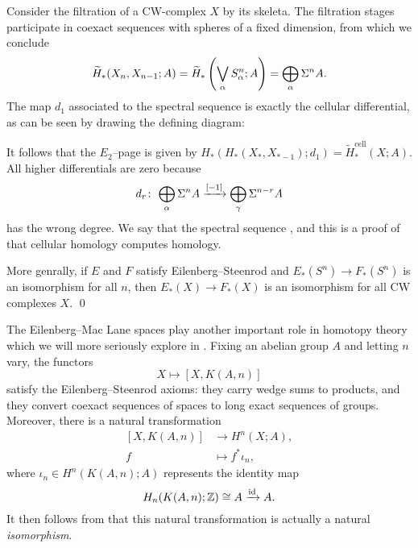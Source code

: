 \begin{example}\label{CellularHomologyWorks}
Consider the filtration of a CW-complex $X$ by its skeleta.
The filtration stages participate in coexact sequences with spheres of a fixed dimension, from which we conclude \[\widetilde H_*(X_n, X_{n-1}; A) = \widetilde H_*\left(\bigvee_\alpha S^n_\alpha ; A\right) = \bigoplus_\alpha \Sigma^n A.\]
The map $d_1$ associated to the spectral sequence is exactly the cellular differential, as can be seen by drawing the defining diagram:
\begin{center}
\end{center}
It follows that the $E_2$--page is given by $H_*(H_*(X_*, X_{*-1}); d_1) = \widetilde H_*^{\mathrm{cell}}(X; A)$.
All higher differentials are zero because \[d_r\colon\thinspace \bigoplus_\alpha \Sigma^n A \xrightarrow{[-1]} \bigoplus_\gamma \Sigma^{n-r} A\] has the wrong degree.
We say that the spectral sequence , and this is a proof of that cellular homology computes homology.
\end{example}

\begin{corollary}\label{SpheresDetectEquivalenceOfCohomologyTheories}
More genrally, if $E$ and $F$ satisfy Eilenberg--Steenrod and $E_*(S^n) \to F_*(S^n)$ is an isomorphism for all $n$, then $E_*(X) \to F_*(X)$ is an isomorphism for all CW complexes $X$. \qed
\end{corollary}

\begin{example}\label{EMSpacesRepresentOrdinaryCoh}
The Eilenberg--Mac Lane spaces play another important role in homotopy theory which we will more seriously explore in .
Fixing an abelian group $A$ and letting $n$ vary, the functors \[X \mapsto [X, K(A, n)]\] satisfy the Eilenberg--Steenrod axioms: they carry wedge sums to products, and they convert coexact sequences of spaces to long exact sequences of groups.
Moreover, there is a natural transformation
\begin{align*}
{[X, K(A, n)]} & \to H^n(X; A), \\
f & \mapsto f^* \iota_n,
\end{align*}
where $\iota_n \in H^n(K(A, n); A)$ represents the identity map \[H_n(K(A, n); \mathbb Z) \cong A \xrightarrow{\operatorname{id}} A.\]
It then follows from  that this natural transformation is actually a natural \emph{isomorphism}.
\end{example}




